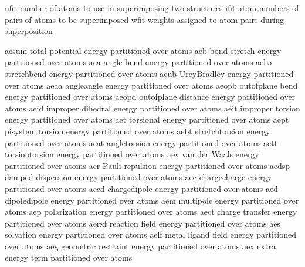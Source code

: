 \documentclass[letterpaper,11pt,english]{sphinxmanual}
\begin{document}

\begin{sphinxVerbatim}[commandchars=\\\{\}]
nfit            number of atoms to use in superimposing two structures
ifit            atom numbers of pairs of atoms to be superimposed
wfit            weights assigned to atom pairs during superposition
\end{sphinxVerbatim}


\begin{sphinxVerbatim}[commandchars=\\\{\}]
aesum           total potential energy partitioned over atoms
aeb             bond stretch energy partitioned over atoms
aea             angle bend energy partitioned over atoms
aeba            stretch\PYGZhy{}bend energy partitioned over atoms
aeub            Urey\PYGZhy{}Bradley energy partitioned over atoms
aeaa            angle\PYGZhy{}angle energy partitioned over atoms
aeopb           out\PYGZhy{}of\PYGZhy{}plane bend energy partitioned over atoms
aeopd           out\PYGZhy{}of\PYGZhy{}plane distance energy partitioned over atoms
aeid            improper dihedral energy partitioned over atoms
aeit            improper torsion energy partitioned over atoms
aet             torsional energy partitioned over atoms
aept            pi\PYGZhy{}system torsion energy partitioned over atoms
aebt            stretch\PYGZhy{}torsion energy partitioned over atoms
aeat            angle\PYGZhy{}torsion energy partitioned over atoms
aett            torsion\PYGZhy{}torsion energy partitioned over atoms
aev             van der Waals energy partitioned over atoms
aer             Pauli repulsion energy partitioned over atoms
aedsp           damped dispersion energy partitioned over atoms
aec             charge\PYGZhy{}charge energy partitioned over atoms
aecd            charge\PYGZhy{}dipole energy partitioned over atoms
aed             dipole\PYGZhy{}dipole energy partitioned over atoms
aem             multipole energy partitioned over atoms
aep             polarization energy partitioned over atoms
aect            charge transfer energy partitioned over atoms
aerxf           reaction field energy partitioned over atoms
aes             solvation energy partitioned over atoms
aelf            metal ligand field energy partitioned over atoms
aeg             geometric restraint energy partitioned over atoms
aex             extra energy term partitioned over atoms
\end{sphinxVerbatim}
\end{document}
